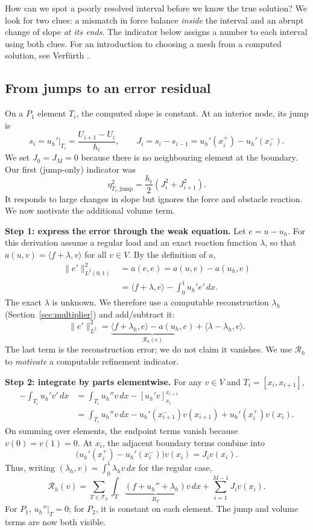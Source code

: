 \documentclass[11pt,a4paper]{article}
\newcommand{\Th}{\mathcal T_h}
\newcommand{\subsect}[1]{\Needspace{5\baselineskip}\subsection{#1}}
\begin{document}
How can we spot a poorly resolved interval before we know the true solution? We look for two clues: a mismatch in force balance \emph{inside} the interval and an abrupt change of slope \emph{at its ends}. The indicator below assigns a number to each interval using both clues. For an introduction to choosing a mesh from a computed solution, see Verf\"urth \cite[Chs.~1--2]{verfurth}.

\subsect{From jumps to an error residual}
On a $P_1$ element $T_i$, the computed slope is constant. At an interior
node, its jump is
\[
 s_i=u_h'|_{T_i}=\frac{U_{i+1}-U_i}{h_i},\qquad
 J_i=s_i-s_{i-1}=u_h'(x_i^+)-u_h'(x_i^-).
\]
We set $J_0=J_M=0$ because there is no neighbouring element at the boundary.
Our first (jump-only) indicator was
\[
 \eta_{T_i,\mathrm{jump}}^2=\frac{h_i}{2}(J_i^2+J_{i+1}^2).
\]
It responds to large changes in slope but ignores the force and obstacle reaction.
We now motivate the additional volume term.

\textbf{Step 1: express the error through the weak equation.}
Let $e=u-u_h$. For this derivation assume a regular load and an exact
reaction function $\lambda$, so that
$a(u,v)=\langle f+\lambda,v\rangle$ for all $v\in V$.
By the definition of $a$,
\begin{align*}
 \|e'\|_{L^2(0,1)}^2
 &=a(e,e)=a(u,e)-a(u_h,e)\\
 &=\langle f+\lambda,e\rangle-\int_0^1u_h'e'\,dx.
\end{align*}
The exact $\lambda$ is unknown. We therefore use a computable reconstruction
$\lambda_h$ (Section~\ref{sec:multiplier}) and add/subtract it:
\[
 \|e'\|_{L^2}^2
 =\underbrace{\langle f+\lambda_h,e\rangle-a(u_h,e)}_{\mathcal R_h(e)}
 +\langle\lambda-\lambda_h,e\rangle.
\]
The last term is the reconstruction error; we do not claim it vanishes.
We use $\mathcal R_h$ to \emph{motivate} a computable refinement indicator.

\textbf{Step 2: integrate by parts elementwise.}
For any $v\in V$ and $T_i=[x_i,x_{i+1}]$,
\begin{align*}
 -\int_{T_i}u_h'v'\,dx
 &=\int_{T_i}u_h''v\,dx-[u_h'v]_{x_i}^{x_{i+1}}\\
 &=\int_{T_i}u_h''v\,dx
   -u_h'(x_{i+1}^-)v(x_{i+1})+u_h'(x_i^+)v(x_i).
\end{align*}
On summing over elements, the endpoint terms vanish because $v(0)=v(1)=0$.
At $x_i$, the adjacent boundary terms combine into
\[
 \bigl(u_h'(x_i^+)-u_h'(x_i^-)\bigr)v(x_i)=J_iv(x_i).
\]
Thus, writing $(\lambda_h,v)=\int_0^1\lambda_hv\,dx$ for the regular case,
\[
 \boxed{\mathcal R_h(v)=
 \sum_{T\in\Th}\int_T\underbrace{(f+u_h''+\lambda_h)}_{R_T}v\,dx
 +\sum_{i=1}^{M-1}J_iv(x_i).}
\]
For $P_1$, $u_h''|_T=0$; for $P_2$, it is constant on each element.
The jump and volume terms are now both visible.
\end{document}
